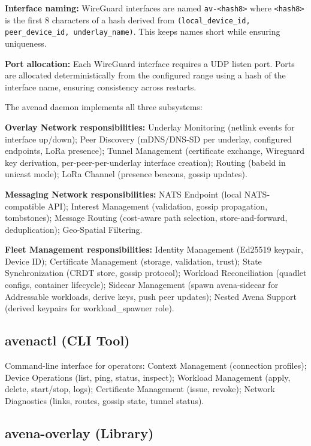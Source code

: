 \textbf{Interface naming:} WireGuard interfaces are named \texttt{av-<hash8>} where \texttt{<hash8>} is the first 8 characters of a hash derived from \texttt{(local\_device\_id, peer\_device\_id, underlay\_name)}. This keeps names short while ensuring uniqueness.

\textbf{Port allocation:} Each WireGuard interface requires a UDP listen port. Ports are allocated deterministically from the configured range using a hash of the interface name, ensuring consistency across restarts.

The avenad daemon implements all three subsystems:

\textbf{Overlay Network responsibilities:} Underlay Monitoring (netlink events for interface up/down); Peer Discovery (mDNS/DNS-SD per underlay, configured endpoints, LoRa presence); Tunnel Management (certificate exchange, Wireguard key derivation, per-peer-per-underlay interface creation); Routing (babeld in unicast mode); LoRa Channel (presence beacons, gossip updates).

\textbf{Messaging Network responsibilities:} NATS Endpoint (local NATS-compatible API); Interest Management (validation, gossip propagation, tombstones); Message Routing (cost-aware path selection, store-and-forward, deduplication); Geo-Spatial Filtering.

\textbf{Fleet Management responsibilities:} Identity Management (Ed25519 keypair, Device ID); Certificate Management (storage, validation, trust); State Synchronization (CRDT store, gossip protocol); Workload Reconciliation (quadlet configs, container lifecycle); Sidecar Management (spawn avena-sidecar for Addressable workloads, derive keys, push peer updates); Nested Avena Support (derived keypairs for workload\_spawner role).

\subsection{avenactl (CLI Tool)}

Command-line interface for operators: Context Management (connection profiles); Device Operations (list, ping, status, inspect); Workload Management (apply, delete, start/stop, logs); Certificate Management (issue, revoke); Network Diagnostics (links, routes, gossip state, tunnel status).

\subsection{avena-overlay (Library)}

